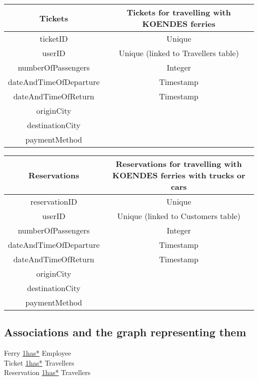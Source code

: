 \begin{table}[H]
\begin{tabular}{|c|c}
\cline{1-1}
Tickets & Tickets for travelling with KOENDES ferries \\ \hline
ticketID & Unique \\ userID &  Unique (linked to Travellers table)  \\ numberOfPassengers & Integer \\ dateAndTimeOfDeparture & Timestamp \\ dateAndTimeOfReturn & Timestamp \\ originCity \\ destinationCity \\ paymentMethod \\\hline
\end{tabular}
\end{table}

\begin{table}[H]
\begin{tabular}{|c|c}
\cline{1-1}
Reservations & Reservations for travelling with KOENDES ferries with trucks or cars \\ \hline
reservationID & Unique \\ userID & Unique (linked to Customers table) \\ numberOfPassengers & Integer \\ dateAndTimeOfDeparture & Timestamp \\ dateAndTimeOfReturn & Timestamp \\ originCity \\ destinationCity \\ paymentMethod  \\\hline
\end{tabular}
\end{table}
\subsection{Associations and the graph representing them}
Ferry \underline{1\phantom{x}\hspace{5ex}has\phantom{x}\hspace{5ex}*} Employee\\
Ticket \underline{1\phantom{x}\hspace{5ex}has\phantom{x}\hspace{5ex}*} Travellers\\
Reservation \underline{1\phantom{x}\hspace{5ex}has\phantom{x}\hspace{5ex}*} Travellers\\
